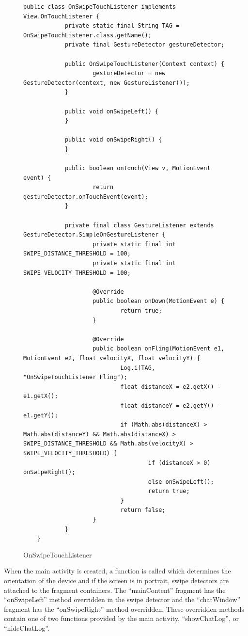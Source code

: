 \begin{figure}[!htpb]
	\centering
	\lstset{language=Java}
	\begin{lstlisting}[tabsize=2,breaklines=true]
	public class OnSwipeTouchListener implements View.OnTouchListener {
			private static final String TAG = OnSwipeTouchListener.class.getName();
			private final GestureDetector gestureDetector;

			public OnSwipeTouchListener(Context context) {
					gestureDetector = new GestureDetector(context, new GestureListener());
			}

			public void onSwipeLeft() {
			}

			public void onSwipeRight() {
			}

			public boolean onTouch(View v, MotionEvent event) {
					return gestureDetector.onTouchEvent(event);
			}

			private final class GestureListener extends GestureDetector.SimpleOnGestureListener {
					private static final int SWIPE_DISTANCE_THRESHOLD = 100;
					private static final int SWIPE_VELOCITY_THRESHOLD = 100;

					@Override
					public boolean onDown(MotionEvent e) {
							return true;
					}

					@Override
					public boolean onFling(MotionEvent e1, MotionEvent e2, float velocityX, float velocityY) {
							Log.i(TAG, "OnSwipeTouchListener Fling");
							float distanceX = e2.getX() - e1.getX();
							float distanceY = e2.getY() - e1.getY();
							if (Math.abs(distanceX) > Math.abs(distanceY) && Math.abs(distanceX) > SWIPE_DISTANCE_THRESHOLD && Math.abs(velocityX) > SWIPE_VELOCITY_THRESHOLD) {
									if (distanceX > 0) onSwipeRight();
									else onSwipeLeft();
									return true;
							}
							return false;
					}
			}
	}
	\end{lstlisting}
	\caption{OnSwipeTouchListener}
	\label{fig:ostl}

\end{figure}

When the main activity is created, a function is called which determines the orientation of the device and if the screen is in portrait, swipe detectors are attached to the fragment containers.  The ``mainContent'' fragment has the ``onSwipeLeft'' method overridden in the swipe detector and the ``chatWindow'' fragment has the ``onSwipeRight'' method overridden.  These overridden methods contain one of two functions provided by the main activity, ``showChatLog'', or ``hideChatLog''.

